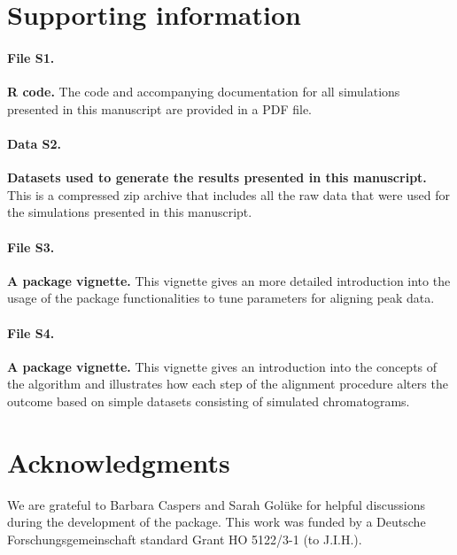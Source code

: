 \documentclass[10pt,letterpaper]{article}
\begin{document}
\section*{Supporting information}

\paragraph*{File S1.}
\label{File S1}
{\bf R code.} The code and accompanying documentation for all simulations presented in this manuscript are provided in a PDF file.

\paragraph*{Data S2.}
\label{Data S2}
{\bf Datasets used to generate the results presented in this manuscript.} This is a compressed zip archive that includes all the raw data that were used for the simulations presented in this manuscript. 

\paragraph*{File S3.}
\label{File S3}
{\bf A package vignette.} This vignette gives an more detailed introduction into the usage of the package functionalities to tune parameters for aligning peak data.

\paragraph*{File S4.}
\label{File S4}
{\bf A package vignette.} This vignette gives an introduction into the concepts of the algorithm and illustrates how each step of the alignment procedure alters the outcome based on simple datasets consisting of simulated chromatograms.

\section*{Acknowledgments}
We are grateful to Barbara Caspers and Sarah Golüke for helpful discussions during the development of the package. This work was funded by a Deutsche Forschungsgemeinschaft standard Grant HO 5122/3-1 (to J.I.H.).

\nolinenumbers
\end{document}
